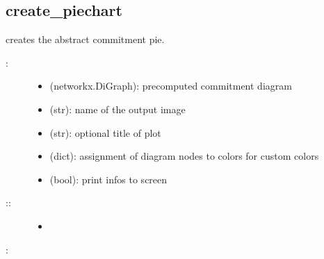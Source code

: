 \documentclass[letterpaper,10pt,english]{sphinxmanual}
\begin{document}
\subsection{create\_piechart}
\label{\detokenize{Phenotypes:phenotypes-create-piechart}}\label{\detokenize{Phenotypes:create-piechart}}

\begin{fulllineitems}
\label{\detokenize{Phenotypes:PyBoolNet.Phenotypes.create_piechart}}
creates the abstract commitment pie.
\begin{description}
\item[{:}] \leavevmode\begin{itemize}
\item {} 
 (networkx.DiGraph): precomputed commitment diagram

\item {} 
 (str): name of the output image

\item {} 
 (str): optional title of plot

\item {} 
 (dict): assignment of diagram nodes to colors for custom colors

\item {} 
 (bool): print infos to screen

\end{itemize}

\item[{::}] \leavevmode\begin{itemize}
\item {} 

\end{itemize}

\end{description}

:

\begin{sphinxVerbatim}[commandchars=\\\{\}]
   
   
  
 
\end{sphinxVerbatim}


\end{fulllineitems}
\end{document}
